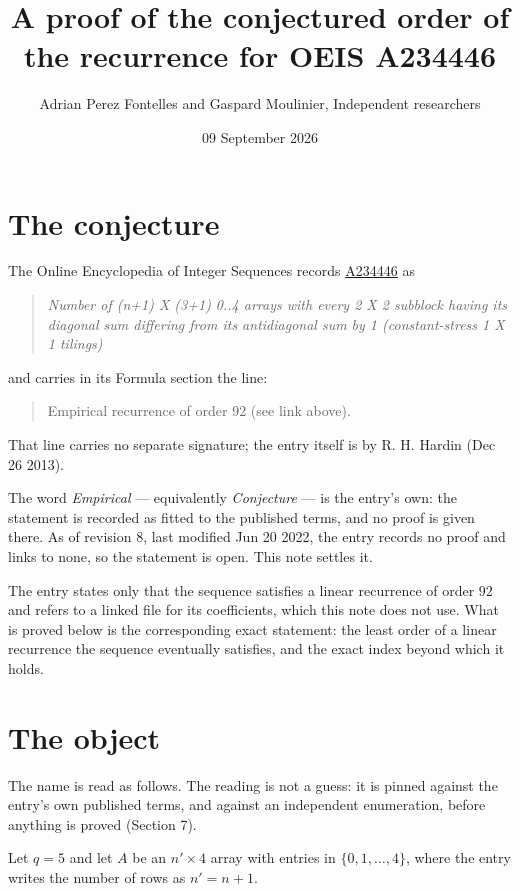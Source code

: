 \documentclass[11pt]{article}
\title{A proof of the conjectured order of the recurrence for OEIS A234446}
\author{Adrian Perez Fontelles and Gaspard Moulinier, Independent researchers}
\date{09 September 2026}
\theoremstyle{definition}
\begin{document}
\maketitle
\section{The conjecture}

The Online Encyclopedia of Integer Sequences records \href{https://oeis.org/A234446}{A234446} as

\begin{quote}\itshape Number of (n+1) X (3+1) 0..4 arrays with every 2 X 2 subblock having its diagonal sum differing from its antidiagonal sum by 1 (constant-stress 1 X 1 tilings)\end{quote}

and carries in its Formula section the line:

\begin{quote}\ttfamily Empirical recurrence of order 92 (see link above).\end{quote}

That line carries no separate signature; the entry itself is by R. H. Hardin (Dec 26 2013).

The word {\itshape Empirical} --- equivalently {\itshape Conjecture} --- is the entry's own: the statement is recorded as fitted to the published terms, and no proof is given there. As of revision 8, last modified Jun 20 2022, the entry records no proof and links to none, so the statement is open. This note settles it.

The entry states only that the sequence satisfies a linear recurrence of order $92$ and refers to a linked file for its coefficients, which this note does not use. What is proved below is the corresponding exact statement: the least order of a linear recurrence the sequence eventually satisfies, and the exact index beyond which it holds.

\section{The object}

The name is read as follows. The reading is not a guess: it is pinned against the entry's own published terms, and against an independent enumeration, before anything is proved (Section 7).

Let $q = 5$ and let $A$ be an $n' \times 4$ array with entries in $\{0,1,\dots,4\}$, where the entry writes the number of rows as $n' = n + 1$.
\end{document}

